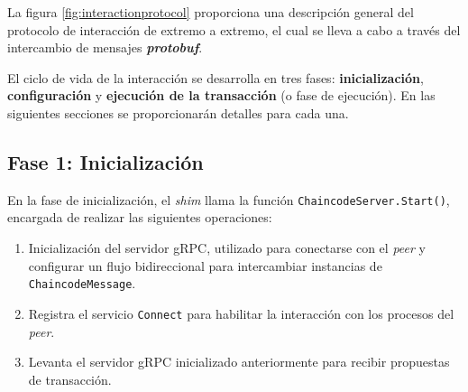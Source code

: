 La figura \ref{fig:interactionprotocol} proporciona una descripción general del protocolo de interacción de extremo a extremo, el cual se lleva a cabo a través del intercambio de mensajes \textit{\textbf{protobuf}}.

El ciclo de vida de la interacción se desarrolla en tres fases: \textbf{inicialización}, \textbf{configuración} y \textbf{ejecución de la transacción} (o fase de ejecución). En las siguientes secciones se proporcionarán detalles para cada una.

\subsection{Fase 1: Inicialización}
%
%
%
%

En la fase de inicialización, el \textit{shim} llama la función  \texttt{ChaincodeServer.Start()}, encargada de realizar las siguientes operaciones:

\begin{enumerate}
\item Inicialización del servidor gRPC, utilizado para conectarse con el \textit{peer} y configurar un flujo bidireccional para intercambiar instancias de \texttt{ChaincodeMessage}.


\item Registra el servicio \texttt{Connect} para habilitar la interacción con los procesos del \textit{peer}.

\item Levanta el servidor gRPC inicializado anteriormente  para recibir propuestas de transacción.
\end{enumerate}


